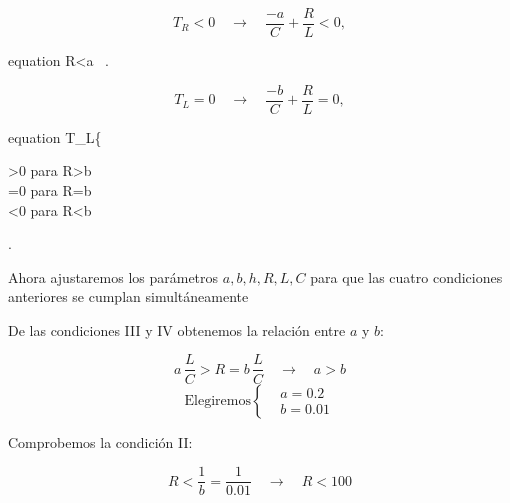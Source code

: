 \documentclass[12pt,a4paper]{report} %
\begin{document}
	\begin{equation*}
		T_R<0 \quad \longrightarrow \quad \frac{-a}{C}+\frac{R}{L}<0,
	\end{equation*}\smallskip
	\begin{empheq}[box=\fbox]{equation}
		\label{eq:cond3}
		R<a \, .
	\end{empheq}
	
	\vspace{1cm}{\large\textbullet\quad Condición IV}
	
	\begin{equation*}
		T_L=0 \quad \longrightarrow \quad \frac{-b}{C}+\frac{R}{L}=0,
	\end{equation*}\smallskip
	\begin{empheq}[box=\fbox]{equation}
		\label{eq:cond4}
		T_L\left\{
		\begin{aligned}
			>0 \qquad para \quad R>b \, \\[3mm]
			=0 \qquad para \quad R=b \, \\[3mm]
			<0 \qquad para \quad R<b \, 
		\end{aligned}
		\right.
	\end{empheq}
	
	\newpage
	
	Ahora ajustaremos los parámetros $a,b,h,R,L,C$ para que las cuatro condiciones anteriores se cumplan simultáneamente
	
	\vspace{0.5cm}\noindent De las condiciones III y IV obtenemos la relación entre $a$ y $b$:
	
	\begin{equation*}
		a \, \frac{L}{C}>R=b \, \frac{L}{C} \quad \longrightarrow \quad a>b
	\end{equation*}\smallskip
	\begin{equation}
		\label{c1f}
		\text{Elegiremos}\left\{
		\begin{aligned}
			&a=0.2\\[2mm]
			&b=0.01
		\end{aligned}
		\right.
	\end{equation}
	
	\vspace{0.5cm}\noindent Comprobemos la condición II:
	
	\begin{equation}
		\label{eq:c2f}
		R<\frac{1}{b}=\frac{1}{0.01} \quad \longrightarrow \quad R<100
	\end{equation}\smallskip
	
\end{document}
